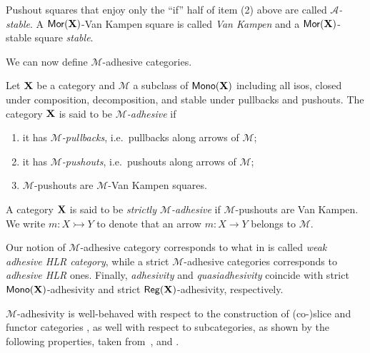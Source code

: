 \documentclass[3p]{elsarticle}
\def\X{\textbf {\textup{X}}}
\newcommand{\mor}{\mathsf{Mor}}
\newcommand{\mon}{\mathsf{Mono}}
\newcommand{\reg}{\mathsf{Reg}}
\newcommand{\mto}{\rightarrowtail}
\theoremstyle{remark}
\theoremstyle{definition}
\begin{document}
\medskip
Pushout squares that enjoy only the ``if'' half of item (2) above are called \emph{$\mathcal{A}$-stable}. A $\mor(\X)$-Van Kampen square is called  \emph{Van
Kampen} and a $\mor(\X)$-stable square  \emph{stable}.

We can now define $\mathcal{M}$-adhesive categories.

\begin{defi}
	Let $\X$ be a category and $\mathcal{M}$ a subclass of
	$\mon(\X)$  including  all isos, closed under composition, decomposition,  and stable under pullbacks and pushouts.  The category  $\X$ is said to be \emph{$\mathcal{M}$-adhesive} if
	\begin{enumerate}
		\item it has \emph{$\mathcal{M}$-pullbacks}, i.e.~pullbacks along arrows of $\mathcal{M}$;
		\item it has \emph{$\mathcal{M}$-pushouts}, i.e.~pushouts along arrows of $\mathcal{M}$;
		\item  $\mathcal{M}$-pushouts are $\mathcal{M}$-Van Kampen squares.
	\end{enumerate}
	A category $\X$ is said to be \emph{strictly $\mathcal{M}$-adhesive}
	if $\mathcal{M}$-pushouts are Van Kampen. We write $m\colon X \mto Y$ to denote that an arrow $m\colon X\to Y$ belongs to $\mathcal{M}$.
\end{defi}



\begin{rem}
	\label{rem:salva} Our notion of $\mathcal{M}$-adhesive category corresponds to what in \cite{ehrig2006fundamentals} is called \emph{weak adhesive HLR category}, while a strict $\mathcal{M}$-adhesive categories corresponds to \emph{adhesive HLR} ones. Finally, 	\emph{adhesivity} and \emph{quasiadhesivity} 
	\cite{lack2005adhesive,garner2012axioms} coincide with strict
	$\mon(\X) $-adhesivity and strict $\reg(\X)$-adhesivity,
	respectively. %
\end{rem}


$\mathcal{M}$-adhesivity is well-behaved with respect to  the construction of (co-)slice and functor categories \cite{mac2013categories}, as well with respect to subcategories, as shown by the following properties, taken from~\cite[Thm.~4.15]{ehrig2006fundamentals}, \cite[Prop.~3.5]{lack2005adhesive} and  \cite[Thm.~2.12]{CastelnovoGM24}.
\end{document}
